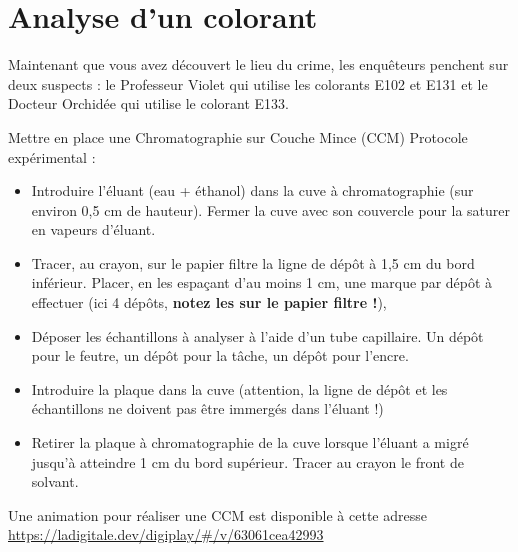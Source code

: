 \section{Analyse d'un colorant}
Maintenant que vous avez découvert le lieu du crime, les enquêteurs penchent sur deux suspects : le Professeur Violet qui utilise les colorants E102 et E131 et le Docteur Orchidée qui utilise le colorant E133.\\

\begin{doc}{Mettre en place une Chromatographie sur Couche Mince (CCM)}
Protocole expérimental :
    \begin{itemize}
        \item Introduire l’éluant (eau + éthanol) dans la cuve à chromatographie (sur environ 0,5 cm de hauteur). Fermer la cuve avec son couvercle pour la saturer en vapeurs d’éluant.
        \item Tracer, au crayon, sur le papier filtre la ligne de dépôt à 1,5 cm du bord inférieur. Placer, en les espaçant d’au moins 1 cm, une marque par dépôt à effectuer (ici 4 dépôts, \textbf{notez les sur le papier filtre !}),
        \item Déposer les échantillons à analyser à l’aide d’un tube capillaire. Un dépôt pour le feutre, un dépôt pour la tâche, un dépôt pour l’encre.
        \item Introduire la plaque dans la cuve (attention, la ligne de dépôt et les échantillons ne doivent pas être immergés dans l’éluant !) 
        \item Retirer la plaque à chromatographie de la cuve lorsque l’éluant a migré jusqu’à atteindre 1 cm du bord supérieur. Tracer au crayon le front de solvant.
    \end{itemize}
Une animation pour réaliser une CCM est disponible à cette adresse \url{https://ladigitale.dev/digiplay/#/v/63061cea42993} 
\end{doc}
